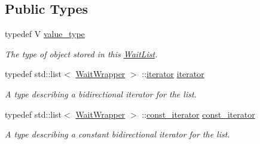 \subsection*{\-Public \-Types}
\begin{DoxyCompactItemize}
\item 
typedef \-V \hyperlink{classLibWheel_1_1WaitList_a1ff6e1745f202171e2d3a17a114c58af}{value\-\_\-type}
\begin{DoxyCompactList}\small\item\em \-The type of object stored in this \hyperlink{classLibWheel_1_1WaitList}{\-Wait\-List}. \end{DoxyCompactList}\item 
typedef std\-::list$<$ \hyperlink{classLibWheel_1_1WaitList_1_1WaitWrapper}{\-Wait\-Wrapper} $>$\*
\-::\hyperlink{classLibWheel_1_1WaitList_a197f2582847b549a89b833d2eb153b1c}{iterator} \hyperlink{classLibWheel_1_1WaitList_a197f2582847b549a89b833d2eb153b1c}{iterator}
\begin{DoxyCompactList}\small\item\em \-A type describing a bidirectional iterator for the list. \end{DoxyCompactList}\item 
typedef std\-::list$<$ \hyperlink{classLibWheel_1_1WaitList_1_1WaitWrapper}{\-Wait\-Wrapper} $>$\*
\-::\hyperlink{classLibWheel_1_1WaitList_a016ac87f7ff3d47c628a091581baa840}{const\-\_\-iterator} \hyperlink{classLibWheel_1_1WaitList_a016ac87f7ff3d47c628a091581baa840}{const\-\_\-iterator}
\begin{DoxyCompactList}\small\item\em \-A type describing a constant bidirectional iterator for the list. \end{DoxyCompactList}\end{DoxyCompactItemize}
